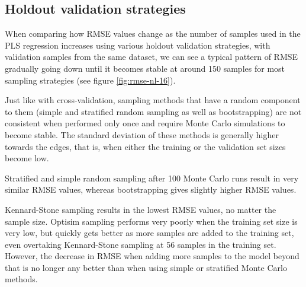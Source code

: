 \documentclass{isprs}
\begin{document}
\subsection{Holdout validation strategies}\label{sec:Holdout validation strategies 2}

When comparing how RMSE values change as the number of samples used in the PLS regression increases using various holdout validation strategies, with validation samples from the same dataset, we can see a typical pattern of RMSE gradually going down until it becomes stable at around 150 samples for most sampling strategies (see figure \ref{fig:rmse-nl-16}).

Just like with cross-validation, sampling methods that have a random component to them (simple and stratified random sampling as well as bootstrapping) are not consistent when performed only once and require Monte Carlo simulations to become stable. The standard deviation of these methods is generally higher towards the edges, that is, when either the training or the validation set sizes become low.

Stratified and simple random sampling after 100 Monte Carlo runs result in very similar RMSE values, whereas bootstrapping gives slightly higher RMSE values.

Kennard-Stone sampling results in the lowest RMSE values, no matter the sample size. Optisim sampling performs very poorly when the training set size is very low, but quickly gets better as more samples are added to the training set, even overtaking Kennard-Stone sampling at 56 samples in the training set. However, the decrease in RMSE when adding more samples to the model beyond that is no longer any better than when using simple or stratified Monte Carlo methods.
\end{document}
